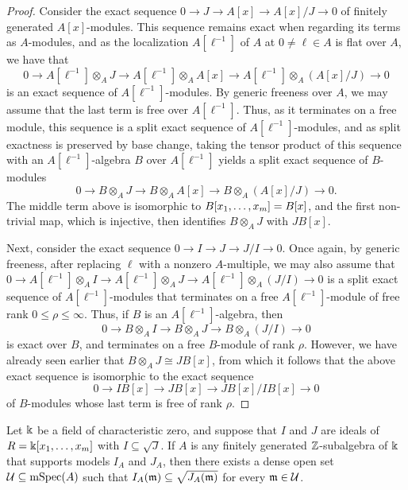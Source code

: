 \documentclass{amsart}
\begin{document}
\begin{proof} Consider the exact sequence $0 \to J \to A[x] \to A[x]/J \to 0$ of finitely generated $A[x]$-modules.  This sequence remains exact when regarding its terms as $A$-modules, and as the localization $A[\ell^{-1}]$ of $A$ at $0 \neq \ell \in A$ is flat over $A$, we have that
\[ 0 \to A[\ell^{-1}] \otimes_A J \to A[\ell^{-1}] \otimes_A A[x] \to A[\ell^{-1}] \otimes_A (A[x]/J) \to 0 \]
is an exact sequence of $A[\ell^{-1}]$-modules.
By generic freeness over $A$, we may assume that the last term is free over $A[\ell^{-1}]$.
Thus, as it terminates on a free module, this sequence is a split exact sequence of $A[\ell^{-1}]$-modules, and as split exactness is preserved by base change, taking the tensor product of this sequence with an $A[\ell^{-1}]$-algebra $B$ over $A[\ell^{-1}]$ yields a split exact sequence  of $B$-modules
%
\[ 0 \to B \otimes_A J \to B \otimes_A A[x] \to B \otimes_A (A[x]/J) \to 0. \]
%
The middle term above is isomorphic to $B[x_1, \ldots, x_m]=B[x]$,  and the first non-trivial map, which is injective, then identifies $B \otimes_A J$ with $JB[x]$.

Next, consider the exact sequence $0 \to I \to J \to J/I \to 0$.  Once again, by generic freeness, after replacing $\ell$ with a nonzero $A$-multiple, we may also assume that
%
$0 \to A[\ell^{-1}] \otimes_A I \to A[\ell^{-1}] \otimes_A J \to A[\ell^{-1}] \otimes_A (J/I) \to 0$
is a split exact sequence of $A[\ell^{-1}]$-modules that terminates on a free $A[\ell^{-1}]$-module of free rank $0 \leq \rho \leq \infty$.  Thus, if $B$ is an $A[\ell^{-1}]$-algebra, then
%
\[ 0 \to B \otimes_A I \to B \otimes_A J \to B \otimes_A (J/I) \to 0\]
%
is exact over $B$, and terminates on a free $B$-module of rank $\rho$.  However, we have already seen earlier that $B \otimes_A J \cong JB[x]$, from which it follows that the above exact sequence is isomorphic to the exact sequence
 \[ 0 \to I  B[x] \to J B[x] \to  J B[x] /IB[x]  \to 0\]
 of $B$-modules whose last term is free of rank $\rho$.
\end{proof}

\begin{corollary}
\label{containment in radical mod p: C}
Let $\Bbbk$ be a field of characteristic zero, and suppose that $I$ and $J$ are ideals of $R=\Bbbk[x_1, \ldots, x_m]$ with $I \subseteq \sqrt{J}$.  If $A$ is any finitely generated $\mathbb{Z}$-subalgebra of $\Bbbk$ that supports models $I_A$ and $J_A$, then there exists a dense open set $\mathcal{U} \subseteq \operatorname{mSpec}(A)$ such that $I_A(\mathfrak{m}) \subseteq \sqrt{J_A(\mathfrak{m})}$ for every $\mathfrak{m} \in \mathcal{U}$.
\end{corollary}
\end{document}
